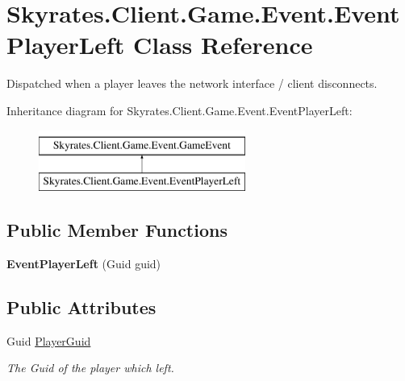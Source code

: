 \hypertarget{class_skyrates_1_1_client_1_1_game_1_1_event_1_1_event_player_left}{\section{Skyrates.\-Client.\-Game.\-Event.\-Event\-Player\-Left Class Reference}
\label{class_skyrates_1_1_client_1_1_game_1_1_event_1_1_event_player_left}
}


Dispatched when a player leaves the network interface / client disconnects.  


Inheritance diagram for Skyrates.\-Client.\-Game.\-Event.\-Event\-Player\-Left\-:\begin{figure}[H]
\begin{center}
\leavevmode
\includegraphics[height=2.000000cm]{class_skyrates_1_1_client_1_1_game_1_1_event_1_1_event_player_left}
\end{center}
\end{figure}
\subsection*{Public Member Functions}
\begin{DoxyCompactItemize}
\item 
\hypertarget{class_skyrates_1_1_client_1_1_game_1_1_event_1_1_event_player_left_ad1f2303f537d505941bb982b228dcd04}{{\bfseries Event\-Player\-Left} (Guid guid)}\label{class_skyrates_1_1_client_1_1_game_1_1_event_1_1_event_player_left_ad1f2303f537d505941bb982b228dcd04}

\end{DoxyCompactItemize}
\subsection*{Public Attributes}
\begin{DoxyCompactItemize}
\item 
Guid \hyperlink{class_skyrates_1_1_client_1_1_game_1_1_event_1_1_event_player_left_acf2e0404fa31a728d52f9fd12fec8bd3}{Player\-Guid}
\begin{DoxyCompactList}\small\item\em The Guid of the player which left. \end{DoxyCompactList}\end{DoxyCompactItemize}


